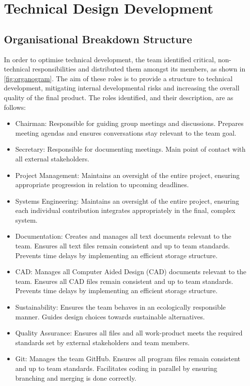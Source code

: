 \chapter{Technical Design Development}

\section{Organisational Breakdown Structure}
In order to optimise technical development, the team identified critical, non-technical responsibilities and distributed them amongst its members, as shown in \autoref{fig:organogram}. The aim of these roles is to provide a structure to technical development, mitigating internal developmental risks and increasing the overall quality of the final product. The roles identified, and their description, are as follows:

\begin{itemize}
    \item Chairman: Responsible for guiding group meetings and discussions. Prepares meeting agendas and ensures conversations stay relevant to the team goal.
    \item Secretary: Responsible for documenting meetings. Main point of contact with all external stakeholders.
    \item Project Management: Maintains an oversight of the entire project, ensuring appropriate progression in relation to upcoming deadlines.
    \item Systems Engineering: Maintains an oversight of the entire project, ensuring each individual contribution integrates appropriately in the final, complex system.
    \item Documentation: Creates and manages all text documents relevant to the team. Ensures all text files remain consistent and up to team standards. Prevents time delays by implementing an efficient storage structure.
    \item CAD: Manages all Computer Aided Design (CAD) documents relevant to the team. Ensures all CAD files remain consistent and up to team standards. Prevents time delays by implementing an efficient storage structure.
    \item Sustainability: Ensures the team behaves in an ecologically responsible manner. Guides design choices towards sustainable alternatives.
    \item Quality Assurance: Ensures all files and all work-product meets the required standards set by external stakeholders and team members.
    \item Git: Manages the team GitHub. Ensures all program files remain consistent and up to team standards. Facilitates coding in parallel by ensuring branching and merging is done correctly.
\end{itemize}

